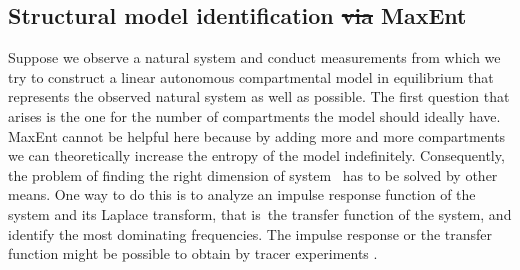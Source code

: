 \documentclass[smallextended]{svjour3}
\makeatletter
\renewcommand*{\eqref}[1]{%
  \hyperref[{#1}]{\textup{\tagform@{\ref*{#1}}}}%
}
\newcommand{\ie}{that is}
\providecommand{\DIFaddtex}[1]{{\protect\color{blue}\uwave{#1}}} %
\providecommand{\DIFdeltex}[1]{{\protect\color{red}\sout{#1}}}                      %
\providecommand{\DIFaddbegin}{} %
\providecommand{\DIFaddend}{} %
\providecommand{\DIFdelbegin}{} %
\providecommand{\DIFdelend}{} %
\providecommand{\DIFadd}[1]{\texorpdfstring{\DIFaddtex{#1}}{#1}} %
\providecommand{\DIFdel}[1]{\texorpdfstring{\DIFdeltex{#1}}{}} %
\newcommand{\DIFscaledelfig}{0.5}
\newlength{\DIFdelgraphicswidth} %
\newlength{\DIFdelgraphicsheight} %
\newcommand{\DIFaddincludegraphics}[2][]{{\color{blue}\fbox{\DIFOincludegraphics[#1]{#2}}}} %
\newcommand{\DIFdelincludegraphics}[2][]{%
\sbox{\DIFdelgraphicsbox}{\DIFOincludegraphics[#1]{#2}}%
\settoboxwidth{\DIFdelgraphicswidth}{\DIFdelgraphicsbox} %
\settoboxtotalheight{\DIFdelgraphicsheight}{\DIFdelgraphicsbox} %
\scalebox{\DIFscaledelfig}{%
\parbox[b]{\DIFdelgraphicswidth}{\usebox{\DIFdelgraphicsbox}\\[-\baselineskip] \rule{\DIFdelgraphicswidth}{0em}}\llap{\resizebox{\DIFdelgraphicswidth}{\DIFdelgraphicsheight}{%
\setlength{\unitlength}{\DIFdelgraphicswidth}%
\begin{picture}(1,1)%
\thicklines\linethickness{2pt} %
{\color[rgb]{1,0,0}\put(0,0){\framebox(1,1){}}}%
{\color[rgb]{1,0,0}\put(0,0){\line( 1,1){1}}}%
{\color[rgb]{1,0,0}\put(0,1){\line(1,-1){1}}}%
\end{picture}%
}\hspace*{3pt}}} %
} %
\DeclareRobustCommand{\DIFaddbegin}{\DIFOaddbegin \let\includegraphics\DIFaddincludegraphics} %
\DeclareRobustCommand{\DIFaddend}{\DIFOaddend \let\includegraphics\DIFOincludegraphics} %
\DeclareRobustCommand{\DIFdelbegin}{\DIFOdelbegin \let\includegraphics\DIFdelincludegraphics} %
\DeclareRobustCommand{\DIFdelend}{\DIFOaddend \let\includegraphics\DIFOincludegraphics} %
\makeatother
\begin{document}
\subsection{Structural model identification \DIFdelbegin \DIFdel{via }\DIFdelend \DIFaddbegin \DIFadd{assisted by }\DIFaddend MaxEnt}
Suppose we observe a natural system and conduct measurements from which we try to construct a linear autonomous compartmental model in equilibrium that represents the observed natural system as well as possible.
The first question that arises is the one for the number of compartments the model should ideally have.
MaxEnt cannot be helpful here because by adding more and more compartments we can theoretically increase the entropy of the model indefinitely.
Consequently, the problem of finding the right dimension of system~\eqref{eqn:lin_CS_sys} has to be solved by other means.
One way to do this is to analyze an impulse response function of the system and its Laplace transform, \ie\ the transfer function of the system, and identify the most dominating frequencies.
The impulse response or the transfer function might be possible to obtain by tracer experiments \citep{Anderson1983, Walter1986MBS}.
\end{document}
